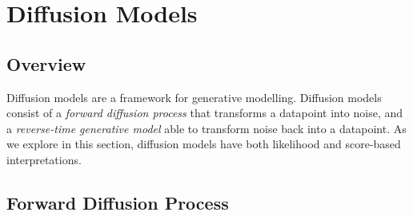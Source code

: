 \documentclass[ oneside,%
                    author={George Herbert},
                    degree={MSci},
                     title={Video Diffusion Models for Climate Simulations},
                  subtitle={}]{dissertation}
\begin{document}
\section{Diffusion Models}
\label{sec:background_diffusion}

\subsection{Overview}
\label{sec:background_diffusion_overview}

Diffusion models \cite{Deep_Unsupervised_Learning_Sohl-Dickstein,DDPM_Ho,Score_Based_Song} are a framework for generative modelling. Diffusion models consist of a \textit{forward diffusion process} that transforms a datapoint into noise, and a \textit{reverse-time generative model} able to transform noise back into a datapoint. As we explore in this section, diffusion models have both likelihood and score-based interpretations.

\subsection{Forward Diffusion Process}
\label{sec:background_diffusion_forward}
\end{document}
